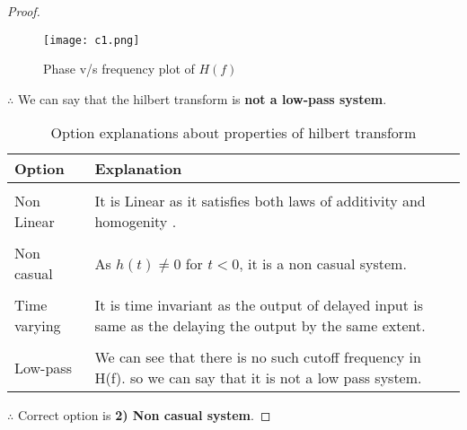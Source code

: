 \documentclass[journal,12pt,twocolumn]{IEEEtran}
\begin{document}
\begin{proof}
\begin{enumerate}
  \begin{figure}[!htp]
\centering
 \texttt{[image: c1.png]}
 \caption{Phase v/s frequency plot of $H(f)$}

 \end{figure}

\newpage
$\therefore$ We can say that the hilbert transform is \textbf{not a low-pass system}.
\end{enumerate}
\begin{table}[h!]
\centering
\begin{tabular}{| m{2cm}| m{5.5cm} |} 
\hline
\textbf{Option} & \textbf{Explanation} \\
\hline&\\[-1em]
Non Linear & It is Linear as it satisfies both laws of additivity and homogenity .\\[2pt]
\hline&\\[-1em]
Non casual& As $h(t)\ne0$ for $t<0$, it is a non casual system.\\[2pt]
\hline&\\[-1em]
Time varying&It is time invariant as the output of delayed input is same as the delaying the output by the same extent. \\[2pt]
\hline&\\[-1em]
Low-pass & We can see that there is no such cutoff frequency in H(f). so we can say that it is not a low pass system.\\
\hline
\end{tabular}
\caption{Option explanations about properties of hilbert transform}
\label{table1}
\end{table}
$\therefore$ Correct option is \textbf{2) Non casual system}.
\end{proof}
\end{document}
